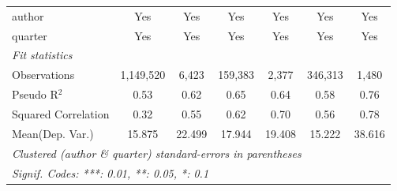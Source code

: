 \begin{tabular}{lcccccc}
   author                                                     & Yes            & Yes            & Yes           & Yes           & Yes           & Yes\\  
   quarter                                                    & Yes            & Yes            & Yes           & Yes           & Yes           & Yes\\  
   \midrule
   \emph{Fit statistics}\\
   Observations                                               & 1,149,520      & 6,423          & 159,383       & 2,377         & 346,313       & 1,480\\  
   Pseudo R$^2$                                               & 0.53           & 0.62           & 0.65          & 0.64          & 0.58          & 0.76\\  
   Squared Correlation                                        & 0.32           & 0.55           & 0.62          & 0.70          & 0.56          & 0.78\\  
Mean(Dep. Var.) & 15.875 & 22.499 & 17.944 & 19.408 & 15.222 & 38.616 \\
   \midrule \midrule
   \multicolumn{7}{l}{\emph{Clustered (author \& quarter) standard-errors in parentheses}}\\
   \multicolumn{7}{l}{\emph{Signif. Codes: ***: 0.01, **: 0.05, *: 0.1}}\\
\end{tabular}
\par\endgroup
